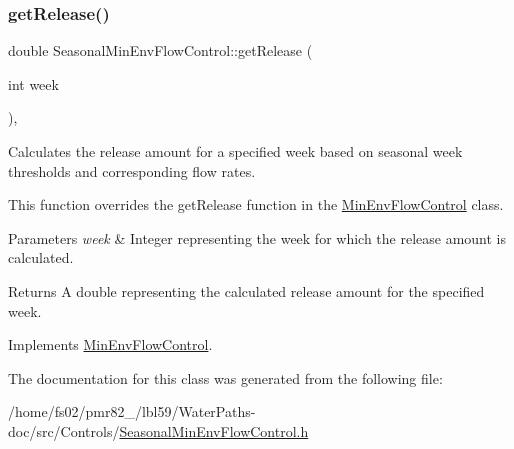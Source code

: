 \subsubsection{\texorpdfstring{get\+Release()}{getRelease()}}
{\footnotesize\ttfamily double Seasonal\+Min\+Env\+Flow\+Control\+::get\+Release (\begin{DoxyParamCaption}\item[{int}]{week }\end{DoxyParamCaption})\hspace{0.3cm}{\ttfamily [override]}, {\ttfamily [virtual]}}



Calculates the release amount for a specified week based on seasonal week thresholds and corresponding flow rates. 

This function overrides the {\ttfamily get\+Release} function in the {\ttfamily \mbox{\hyperlink{classMinEnvFlowControl}{Min\+Env\+Flow\+Control}}} class.


\begin{DoxyParams}{Parameters}
{\em week} & Integer representing the week for which the release amount is calculated.\\
\hline
\end{DoxyParams}
\begin{DoxyReturn}{Returns}
A double representing the calculated release amount for the specified week. 
\end{DoxyReturn}


Implements \mbox{\hyperlink{classMinEnvFlowControl_a5de79615852eb0c937dd559a9eb9402d}{Min\+Env\+Flow\+Control}}.



The documentation for this class was generated from the following file\+:\begin{DoxyCompactItemize}
\item 
/home/fs02/pmr82\+\_/lbl59/\+Water\+Paths-\/doc/src/\+Controls/\mbox{\hyperlink{SeasonalMinEnvFlowControl_8h}{Seasonal\+Min\+Env\+Flow\+Control.\+h}}\end{DoxyCompactItemize}
